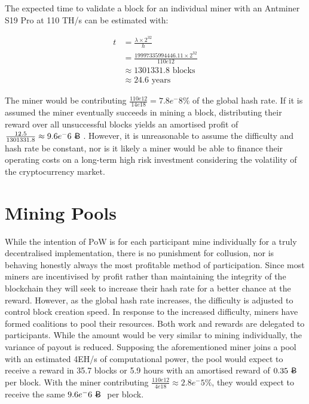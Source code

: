 The expected time to validate a block for an individual miner with an Antminer S19 Pro at 110 TH/s \cite{antminer2018} can be estimated \cite{difficulty2019} with:

\begin{align}
    t &= \frac{\lambda \times 2^{32}}{h} \\
    &= \frac{19997335994446.11 \times 2^{32}}{110e12} \\
    & \approx 1301331.8 \text{ blocks} \\
    & \approx 24.6 \text{ years}
\end{align}

The miner would be contributing $\frac{110e12}{14e18} = 7.8e{^-8}\%$ of the global hash rate. If it is assumed the miner eventually succeeds in mining a block, distributing their reward over all unsuccessful blocks yields an amortised profit of $\frac{12.5}{1301331.8} \approx 9.6e{^-6} \text{\bitcoin}$. However, it is unreasonable to assume the difficulty and hash rate be constant, nor is it likely a miner would be able to finance their operating costs on a long-term high risk investment considering the volatility of the cryptocurrency market.

\section{Mining Pools}

While the intention of PoW is for each participant mine individually for a truly decentralised implementation, there is no punishment for collusion, nor is behaving honestly always the most profitable method of participation. Since most miners are incentivised by profit rather than maintaining the integrity of the blockchain they will seek to increase their hash rate for a better chance at the reward. However, as the global hash rate increases, the difficulty is adjusted to control block creation speed. In response to the increased difficulty, miners have formed coalitions to pool their resources. Both work and rewards are delegated to participants. While the amount would be very similar to mining individually, the variance of payout is reduced. Supposing the aforementioned miner joins a pool with an estimated 4EH/s of computational power, the pool would expect to receive a reward in 35.7 blocks or 5.9 hours with an amortised reward of $0.35\text{\bitcoin}$ per block. With the miner contributing $\frac{110e12}{4e18} \approx 2.8e{^-5}\%$, they would expect to receive the same $9.6e{^-6} \text{\bitcoin}$ per block.

